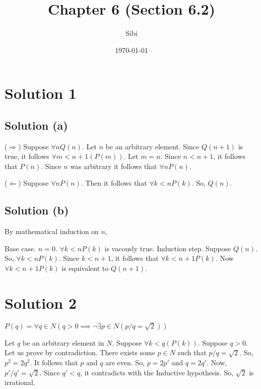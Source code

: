 \documentclass{article}
\begin{document}
\title{Chapter 6 (Section 6.2)}
\author{Sibi}
\date{\today}
\maketitle

\DeclarePairedDelimiter\abs{\lvert}{\rvert}%
\DeclarePairedDelimiter\norm{\lVert}{\rVert}%

\makeatletter
\let\oldabs\abs
\def\abs{\@ifstar{\oldabs}{\oldabs*}}
%
\let\oldnorm\norm
\def\norm{\@ifstar{\oldnorm}{\oldnorm*}}
\makeatother
\newpage

\section{Solution 1}

\subsection{Solution (a)}

($\Rightarrow$) Suppose $\forall n Q(n)$. Let $n$ be an arbitrary element. Since $Q(n+1)$ is true, it follows $\forall m < n + 1(P(m))$. Let $m = n$. Since $n < n + 1$, it follows that $P(n)$. Since $n$ was arbitrary it follows that $\forall n P(n)$.

($\Leftarrow$) Suppose $\forall n P(n)$. Then it follows that $\forall k < n P(k)$. So, $Q(n)$.

\subsection{Solution (b)}

By mathematical induction on $n$,

Base case. $n = 0$. $\forall k < n P(k)$ is vacously true.
Induction step. Suppose $Q(n)$. So, $\forall k < n P(k)$. Since $k < n + 1$, it follows that $\forall k < n + 1 P(k)$. Now $\forall k < n + 1 P(k)$ is equivalent to $Q(n + 1)$.

\section{Solution 2}
$P(q) = \forall q \in N (q > 0 \implies \neg \exists p \in N(p/q = \sqrt{2}))$

Let $q$ be an arbitrary element in $N$. Suppose $\forall k < q(P(k))$. Suppose $q > 0$. Let us prove by contradiction. There exists some $p \in N$ such that $p/q = \sqrt{2}$. So, $p^2 = 2q^2$. It follows that $p$ and $q$ are even. So, $p = 2p'$ and $q = 2q'$. Now, $p'/q' = \sqrt{2}$. Since $q' < q$, it contradicts with the Inductive hypothesis. So, $\sqrt{2}$ is irrational.
\end{document}
